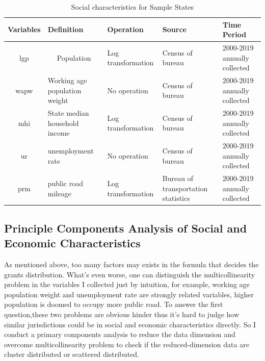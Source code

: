 \begin{table}[H]
  \centering
  \caption{Social characteristics for Sample States}
    \begin{tabular}{cp{6.43em}p{9.285em}p{5.855em}p{5.355em}}
    \toprule
    \multicolumn{1}{p{4em}}{Variables } & Definition & Operation & Source & Time Period \\
    \midrule
    lgp   & \multicolumn{1}{c}{Population } & Log transformation  & Census of bureau & 2000-2019 annually collected \\
    \midrule
    wapw  & Working age population weight & No operation & Census of bureau & 2000-2019 annually collected \\
    \midrule
    mhi   & State median household income & Log transformation  & Census of bureau & 2000-2019 annually collected \\
    \midrule
    ur    & unemployment rate & No operation & Census of bureau & 2000-2019 annually collected \\
    \midrule
    prm   & public road mileage & Log transformation  & Bureau of transportation statistics & 2000-2019 annually collected \\
    \bottomrule
    \end{tabular}%
  \label{Table 2.3}%
\end{table}%

\subsection{Principle Components Analysis of Social and Economic Characteristics}
As mentioned above, too many factors may exists in the formula that decides the grants distribution. What's even worse, one can distinguish the multicollinearity problem in the variables I collected just by intuition, for example, working age population weight and unemployment rate are strongly related variables, higher population is doomed to occupy more public road. To answer the first question,these two problems are obvious hinder thus it's hard to judge how similar jurisdictions could be in social and economic characteristics directly. So I conduct a primary components analysis to reduce the data dimension and overcome multicollinearity problem to check if the reduced-dimension data are cluster distributed or scattered distributed.

